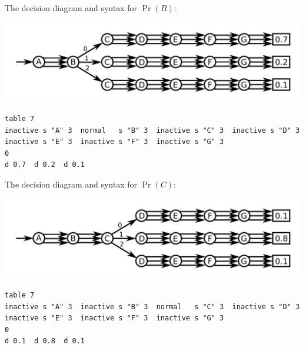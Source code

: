 \documentclass{article}
\begin{document}
\vspace{5mm}

\begin{minipage}{\textwidth}
The decision diagram and syntax for \(\Pr(B)\):

\includegraphics[width = \textwidth]{Pr(B)}

\begin{verbatim}
table 7
inactive s "A" 3  normal   s "B" 3  inactive s "C" 3  inactive s "D" 3 
inactive s "E" 3  inactive s "F" 3  inactive s "G" 3 
0 
d 0.7  d 0.2  d 0.1 
\end{verbatim}
\end{minipage}

\vspace{5mm}

\begin{minipage}{\textwidth}
The decision diagram and syntax for \(\Pr(C)\):

\includegraphics[width = \textwidth]{Pr(C)}

\begin{verbatim}
table 7
inactive s "A" 3  inactive s "B" 3  normal   s "C" 3  inactive s "D" 3 
inactive s "E" 3  inactive s "F" 3  inactive s "G" 3 
0 
d 0.1  d 0.8  d 0.1 
\end{verbatim}
\end{minipage}

\vspace{5mm}
\end{document}
